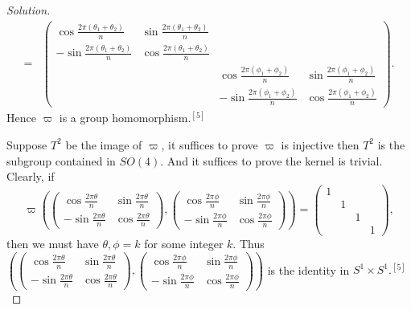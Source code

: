 \documentclass{article}
\theoremstyle{definition}
\theoremstyle{plain}
\begin{document}
\begin{adjustwidth}{0.7cm}{}
\begin{proof}[Solution]
\begin{align*}
=&\begin{pmatrix}\cos\frac{2\pi(\theta_1+\theta_2)}{n}&\sin\frac{2\pi(\theta_1+\theta_2)}{n}&&\\ -\sin\frac{2\pi(\theta_1+\theta_2)}{n}&\cos\frac{2\pi(\theta_1+\theta_2)}{n}&&\\ &&\cos\frac{2\pi(\phi_1+\phi_2)}{n}&\sin\frac{2\pi(\phi_1+\phi_2)}{n}\\ &&-\sin\frac{2\pi(\phi_1+\phi_2)}{n}&\cos\frac{2\pi(\phi_1+\phi_2)}{n}\end{pmatrix}.
\end{align*}
Hence $\varpi$ is a group homomorphism$.^{[5]}$\par
Suppose $T^2$ be the image of $\varpi$, it suffices to prove $\varpi$ is injective then $T^2$ is the subgroup contained in $SO(4)$. And it suffices to prove the kernel is trivial. Clearly, if
\begin{displaymath}
\varpi\left(\begin{pmatrix}\cos\frac{2\pi\theta}{n}&\sin\frac{2\pi\theta}{n}\\ -\sin\frac{2\pi\theta}{n}&\cos\frac{2\pi\theta}{n}\end{pmatrix},\begin{pmatrix}\cos\frac{2\pi\phi}{n}&\sin\frac{2\pi\phi}{n}\\ -\sin\frac{2\pi\phi}{n}&\cos\frac{2\pi\phi}{n}\end{pmatrix}\right)=\begin{pmatrix}1&&&\\ &1&&\\ &&1&\\ &&&1\end{pmatrix},
\end{displaymath}
then we must have $\theta,\phi=k$ for some integer $k$. Thus $\left(\begin{pmatrix}\cos\frac{2\pi\theta}{n}&\sin\frac{2\pi\theta}{n}\\ -\sin\frac{2\pi\theta}{n}&\cos\frac{2\pi\theta}{n}\end{pmatrix},\begin{pmatrix}\cos\frac{2\pi\phi}{n}&\sin\frac{2\pi\phi}{n}\\ -\sin\frac{2\pi\phi}{n}&\cos\frac{2\pi\phi}{n}\end{pmatrix}\right)$ is the identity in $S^1\times S^1.^{[5]}$
\color{black}
\end{proof}
\end{adjustwidth}
\end{document}
